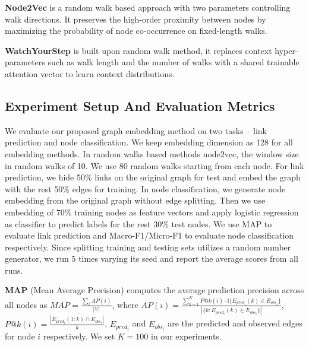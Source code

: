 \documentclass{article}
\begin{document}
\textbf{Node2Vec} is a random walk based approach with two parameters controlling walk directions. It preserves the high-order proximity between nodes by maximizing the probability of node co-occurrence on fixed-length walks. 

\textbf{WatchYourStep} is built upon random walk method, it replaces context hyper-parameters such as walk length and the number of walks with a shared trainable attention vector to learn context distributions.




\subsection{Experiment Setup And Evaluation Metrics}
We evaluate our proposed graph embedding method on two tasks -- link prediction and node classification. We keep embedding dimension as 128 for all embedding methods. In random walks based methods node2vec, the window size in random walks of 10. We use 80 random walks starting from each node. For link prediction, we hide 50\% links on the original graph for test and embed the graph with the rest 50\% edges for training. In node classification, we generate node embedding from the original graph without edge splitting. Then we use embedding of 70\% training nodes as feature vectors and apply logistic regression as classifier to predict labels for the rest 30\% test nodes. We use MAP to evaluate link prediction and Macro-F1/Micro-F1 to evaluate node classification respectively. Since splitting training and testing sets utilizes a random number generator, we run 5 times varying its seed and report the average scores from all runs.


 
\textbf{MAP} (Mean Average Precision) computes the average prediction precision across all nodes as 
$ MAP=\frac{\sum_i AP(i)}{|V|}$,
where $AP(i) = \frac{\sum_{k=1}^K P@k(i) \cdot \mathbb{I}\{E_{pred_i}(k) \in E_{obs_i}\}}{|\{k: E_{pred_i}(k) \in E_{obs_i}\}|}$, $P@k(i) = \frac{|E_{pred_i}(1:k) \cap E_{obs_i}|}{k}$, $E_{pred_i}$ and $E_{obs_i}$ are the predicted and observed edges for node $i$ respectively. We set $K=100$ in our experiments.
\end{document}
